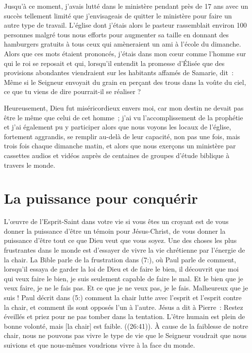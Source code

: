 Jusqu'à ce moment, j'avais lutté dans le ministère pendant près de 17 ans
 avec un succès tellement limité que j'envisageais de quitter le ministère
 pour faire un autre type de travail.
 L'église dont j'étais alors le pasteur rassemblait environ 100 personnes
 malgré tous nous efforts pour augmenter sa taille en donnant des hamburgers
 gratuits à tous ceux qui amèneraient un ami à l'école du dimanche.
 Alors que ces mots étaient prononcés, j'étais dans mon cœur comme l'homme
 sur qui le roi se reposait et qui, lorsqu'il entendit la promesse d'Élisée
 que des provisions abondantes viendraient sur les habitants affamés
 de Samarie, dit~:
 \og Même si le Seigneur envoyait du grain en perçant des trous dans
 la voûte du ciel, ce que tu viens de dire pourrait-il se réaliser ? \fg{}

Heureusement, Dieu fut miséricordieux envers moi,
 car mon destin ne devait pas être le même que celui de cet homme~;
 j'ai vu l'accomplissement de la prophétie et j'ai également pu y participer
 alors que nous voyons les locaux de l'église, fortement aggrandis,
 se remplir au-delà de leur capacité, non pas une fois, mais trois fois
 chaque dimanche matin, et alors que nous exerçons un ministère
 par cassettes audios et vidéos auprès de centaines de groupes
 d'étude biblique à travers le monde.

\section*{La puissance pour conquérir}

L'œuvre de l'Esprit-Saint dans votre vie si vous êtes un croyant
 est de vous donner la puissance d'être un témoin pour Jésus-Christ,
 de vous donner la puissance d'être tout ce que Dieu veut que vous soyez.
 Une des choses les plus frustrantes dans le monde est d'essayer
 de vivre la vie chrétienne par l'énergie de la chair.
 La Bible parle de la frustration dans (7:),
 où Paul parle de comment, lorsqu'il essaya de garder la loi de Dieu
 et de faire le bien, il découvrit que \og moi qui veux faire le bien,
 je suis seulement capable de faire le mal. Et le bien que je veux faire,
 je ne le fais pas. Et ce que je ne veux pas, je le fais.
 Malheureux que je suis ! \fg{}
 Paul décrit dans (5:) comment la chair lutte avec l'esprit
 et l'esprit contre la chair, et comment ils sont opposés l'un à l'autre.
 Jésus a dit à Pierre~:
 \og Restez éveillés et priez pour ne pas tomber dans la tentation.
 L'être humain est plein de bonne volonté, mais [la chair] est faible. \fg{}
 ((26:41)).
 À cause de la faiblesse de notre chair, nous ne pouvons pas vivre
 le type de vie que le Seigneur voudrait que nous suivions
 et que nous-mêmes voudrions vivre à la face du monde.

